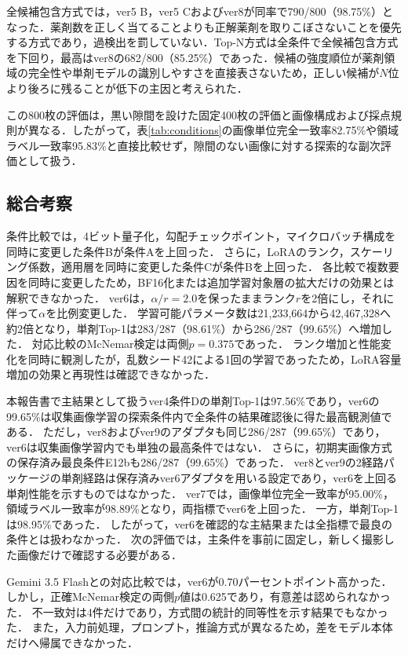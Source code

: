 \documentclass[uplatex,dvipdfmx]{jsarticle}
\begin{document}
全候補包含方式では，ver5 B，ver5 Cおよびver8が同率で790/800（98.75\%）となった．薬剤数を正しく当てることよりも正解薬剤を取りこぼさないことを優先する方式であり，過検出を罰していない．Top-N方式は全条件で全候補包含方式を下回り，最高はver8の682/800（85.25\%）であった．候補の強度順位が薬剤領域の完全性や単剤モデルの識別しやすさを直接表さないため，正しい候補が$N$位より後ろに残ることが低下の主因と考えられた．

この800枚の評価は，黒い隙間を設けた固定400枚の評価と画像構成および採点規則が異なる．したがって，表\ref{tab:conditions}の画像単位完全一致率82.75\%や領域ラベル一致率95.83\%と直接比較せず，隙間のない画像に対する探索的な副次評価として扱う．


\subsection{総合考察}

条件比較では，4ビット量子化，勾配チェックポイント，マイクロバッチ構成を同時に変更した条件Bが条件Aを上回った．
さらに，LoRAのランク，スケーリング係数，適用層を同時に変更した条件Cが条件Bを上回った．
各比較で複数要因を同時に変更したため，BF16化または追加学習対象層の拡大だけの効果とは解釈できなかった．
ver6は，$\alpha/r=2.0$を保ったままランク$r$を2倍にし，それに伴って$\alpha$を比例変更した．
学習可能パラメータ数は21,233,664から42,467,328へ約2倍となり，単剤Top-1は283/287（98.61\%）から286/287（99.65\%）へ増加した．
対応比較のMcNemar検定は両側$p=0.375$であった．
ランク増加と性能変化を同時に観測したが，乱数シード42による1回の学習であったため，LoRA容量増加の効果と再現性は確認できなかった．

本報告書で主結果として扱うver4条件Dの単剤Top-1は97.56\%であり，ver6の99.65\%は収集画像学習の探索条件内で全条件の結果確認後に得た最高観測値である．
ただし，ver8およびver9のアダプタも同じ286/287（99.65\%）であり，ver6は収集画像学習内でも単独の最高条件ではない．
さらに，初期実画像方式の保存済み最良条件E12bも286/287（99.65\%）であった．
ver8とver9の2経路パッケージの単剤経路は保存済みver6アダプタを用いる設定であり，ver6を上回る単剤性能を示すものではなかった．
ver7では，画像単位完全一致率が95.00\%，領域ラベル一致率が98.89\%となり，両指標でver6を上回った．
一方，単剤Top-1は98.95\%であった．
したがって，ver6を確認的な主結果または全指標で最良の条件とは扱わなかった．
次の評価では，主条件を事前に固定し，新しく撮影した画像だけで確認する必要がある．

Gemini 3.5 Flashとの対応比較では，ver6が0.70パーセントポイント高かった．
しかし，正確McNemar検定の両側$p$値は0.625であり，有意差は認められなかった．
不一致対は4件だけであり，方式間の統計的同等性を示す結果でもなかった．
また，入力前処理，プロンプト，推論方式が異なるため，差をモデル本体だけへ帰属できなかった．
\end{document}
